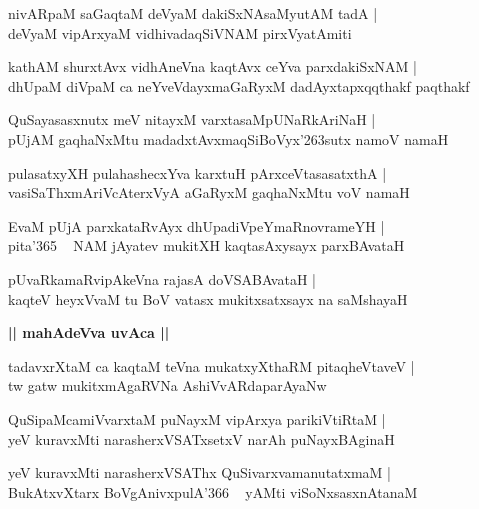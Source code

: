\documentclass[twoside,12pt,openright]{book}
\def\S{\char'263}
\newcounter{shloka}[chapter]
\def\uvaca#1{\centerline{{\large\textbf{#1}}}}
\begin{document}
\begin{shloka}%
nivARpaM saGaqtaM deVyaM dakiSxNAsaMyutAM tadA |\\
deVyaM vipArxyaM vidhivadaqSiVNAM pirxVyatAmiti
\end{shloka}

\begin{shloka}%
kathAM shurxtAvx vidhAneVna kaqtAvx ceYva parxdakiSxNAM |\\
dhUpaM diVpaM ca neYveVdayxmaGaRyxM dadAyxtapxqqthakf paqthakf 
\end{shloka}

\begin{shloka}%
QuSayasasxnutx meV nitayxM varxtasaMpUNaRkAriNaH |\\
pUjAM gaqhaNxMtu madadxtAvxmaqSiBoVyx\S sutx namoV namaH 
\end{shloka}

\begin{shloka}%
pulasatxyXH pulahashecxYva karxtuH pArxceVtasasatxthA |\\
vasiSaThxmAriVcAterxVyA aGaRyxM gaqhaNxMtu voV namaH 
\end{shloka}

\begin{shloka}%
EvaM pUjA parxkataRvAyx dhUpadiVpeYmaRnovrameYH |\\
pita\char'365 ~ NAM jAyatev mukitXH kaqtasAxysayx parxBAvataH 
\end{shloka}

\begin{shloka}%
pUvaRkamaRvipAkeVna rajasA doVSABAvataH |\\
kaqteV heyxVvaM tu BoV vatasx mukitxsatxsayx na saMshayaH  
\end{shloka}

\uvaca{|| mahAdeVva uvAca ||}

\begin{shloka}%
tadavxrXtaM ca kaqtaM teVna mukatxyXthaRM pitaqheVtaveV |\\
tw gatw mukitxmAgaRVNa AshiVvARdaparAyaNw 
\end{shloka}

\begin{shloka}%
QuSipaMcamiVvarxtaM puNayxM vipArxya parikiVtiRtaM |\\
yeV kuravxMti narasherxVSATxsetxV narAh puNayxBAginaH 
\end{shloka}

\begin{shloka}%
yeV kuravxMti narasherxVSAThx QuSivarxvamanutatxmaM |\\
BukAtxvXtarx BoVgAnivxpulA\char'366 ~ yAMti viSoNxsasxnAtanaM 
\end{shloka}
\end{document}
